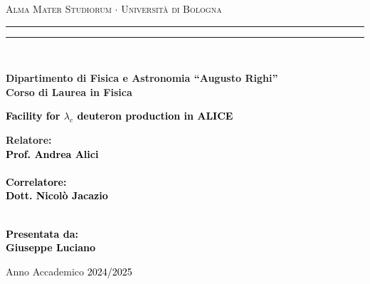 \documentclass[12pt,a4paper]{book}
\begin{document}
	\begin{titlepage}
		\begin{center}
			{{\Large{\textsc{Alma Mater Studiorum $\cdot$ Universit\`a di Bologna}}}} 
			\rule[0.1cm]{15.8cm}{0.1mm}
			\rule[0.5cm]{15.8cm}{0.6mm}
			\\\vspace{3mm}
			
			{\small{\bf Dipartimento di Fisica e Astronomia “Augusto Righi”\\
					Corso di Laurea in Fisica}}
			
		\end{center}
		
		\vspace{23mm}
		
		\begin{center}\textcolor{black}{
				{\LARGE{\bf Facility for $\lambda_c$ deuteron production in ALICE}}\\
		}\end{center}
		
		\vspace{50mm} \par \noindent
		
		\begin{minipage}[t]{0.47\textwidth}
			{\large{\bf Relatore: \vspace{2mm}\\\textcolor{black}{
						Prof. Andrea Alici}\\\\
					\textcolor{black}{
						\bf Correlatore: 
						\vspace{2mm}\\
						Dott. Nicolò Jacazio \\\\}}}
		\end{minipage}
		\hfill
		\begin{minipage}[t]{0.47\textwidth}\raggedleft \textcolor{black}{
				{\large{\bf Presentata da:
						\vspace{2mm}\\
						Giuseppe Luciano}}}
		\end{minipage}
		
		\vspace{40mm}
		
		\begin{center}
			Anno Accademico \textcolor{black}{ 2024/2025}
		\end{center}
		
	\end{titlepage}
	
\end{document}
